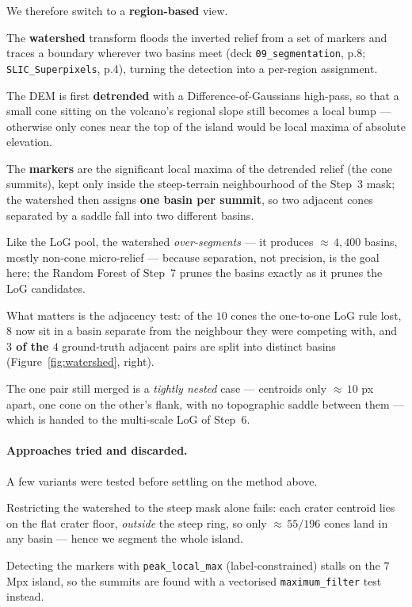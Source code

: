 \documentclass[11pt]{article}
\begin{document}
We therefore switch to a \textbf{region-based} view.

The \textbf{watershed} transform floods the inverted relief from a set of markers and traces a
boundary wherever two basins meet (deck \texttt{09\_segmentation}, p.8; \texttt{SLIC\_Superpixels},
p.4), turning the detection into a per-region assignment.

The DEM is first \textbf{detrended} with a Difference-of-Gaussians high-pass, so that a small cone
sitting on the volcano's regional slope still becomes a local bump --- otherwise only cones near
the top of the island would be local maxima of absolute elevation.

The \textbf{markers} are the significant local maxima of the detrended relief (the cone summits),
kept only inside the steep-terrain neighbourhood of the Step~3 mask; the watershed then assigns
\textbf{one basin per summit}, so two adjacent cones separated by a saddle fall into two different
basins.

Like the LoG pool, the watershed \emph{over-segments} --- it produces $\approx$\,$4{,}400$ basins,
mostly non-cone micro-relief --- because separation, not precision, is the goal here; the Random
Forest of Step~7 prunes the basins exactly as it prunes the LoG candidates.

What matters is the adjacency test: of the $10$ cones the one-to-one LoG rule lost, \textbf{$8$}
now sit in a basin separate from the neighbour they were competing with, and \textbf{$3$ of the
$4$} ground-truth adjacent pairs are split into distinct basins (Figure~\ref{fig:watershed},
right).

The one pair still merged is a \emph{tightly nested} case --- centroids only $\approx$\,$10$ px
apart, one cone on the other's flank, with no topographic saddle between them --- which is handed
to the multi-scale LoG of Step~6.

\paragraph{Approaches tried and discarded.} A few variants were tested before settling on the
method above.

Restricting the watershed to the steep mask alone fails: each crater centroid lies on the flat
crater floor, \emph{outside} the steep ring, so only $\approx$\,$55/196$ cones land in any basin
--- hence we segment the whole island.

Detecting the markers with \texttt{peak\_local\_max} (label-constrained) stalls on the $7$\,Mpx
island, so the summits are found with a vectorised \texttt{maximum\_filter} test instead.
\end{document}

